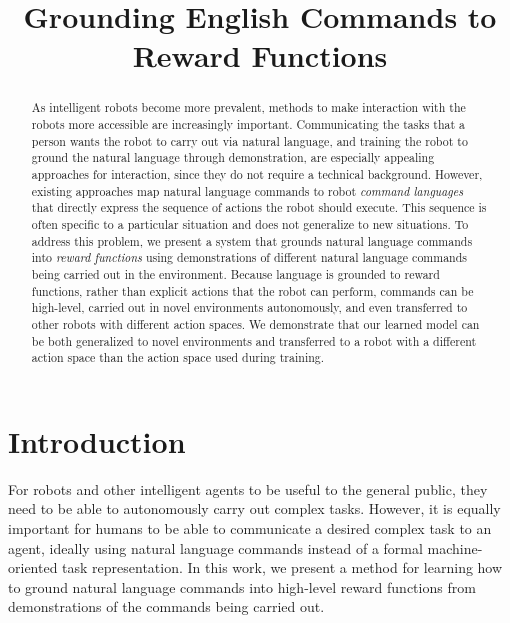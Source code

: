 \documentclass[conference]{IEEEtran}
\title{Grounding English Commands to Reward Functions}
\newcommand\blfootnote[1]{%
  \begingroup
  \renewcommand\thefootnote{}\footnote{#1}%
  \addtocounter{footnote}{-1}%
  \endgroup
}
\begin{document}
\maketitle

\begin{abstract}
As intelligent robots become more prevalent, methods to make
interaction with the robots more accessible are increasingly
important. Communicating the tasks that a person wants the robot to
carry out via natural language, and training the robot to ground the
natural language through demonstration, are especially appealing
approaches for interaction, since they do not require a technical
background.  However, existing approaches map natural language commands
to robot {\em command languages} that directly express the sequence of
actions the robot should execute.  This sequence is often specific to
a particular situation and does not generalize to new situations.  To
address this problem, we present a system that grounds natural
language commands into {\em reward functions} using demonstrations of
different natural language commands being carried out in the
environment.  Because language is grounded to reward functions, rather
than explicit actions that the robot can perform, commands can be
high-level, carried out in novel environments autonomously, and even
transferred to other robots with different action spaces. We
demonstrate that our learned model can be both generalized to novel
environments and transferred to a robot with a different action
space than the action space used during training.
\end{abstract}

\IEEEpeerreviewmaketitle

\section{Introduction}
For robots and other intelligent agents to be useful to the general
public, they need to be able to autonomously carry out complex
tasks. However, it is equally important for humans to be able to
communicate a desired complex task to an agent, ideally using natural
language commands instead of a formal machine-oriented task
representation. In this work, we present a method for learning
how to ground natural language commands into high-level reward functions
from demonstrations of the commands being carried out.
\end{document}
